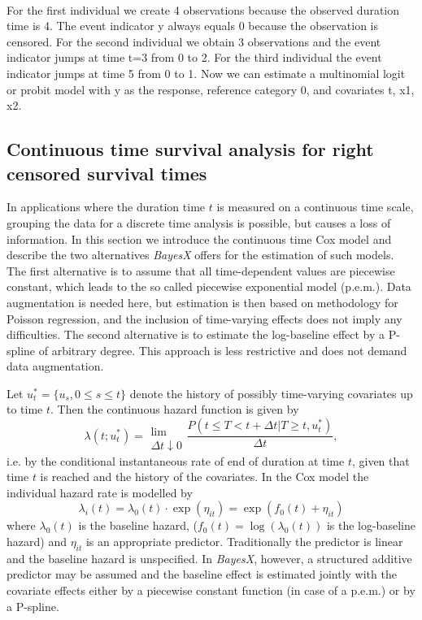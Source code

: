 \documentclass[11pt,a4paper,twoside]{bayesxarticle}
\begin{document}
\vspace{0.5cm}\\
For the first individual we create 4 observations because the
observed duration time is 4. The event indicator y always equals 0
because the observation is censored. For the second individual we
obtain 3 observations and the event indicator jumps at time t=3 from
0 to 2. For the third individual the event indicator jumps at time 5
from 0 to 1. Now we can estimate a multinomial logit or probit model
with y as the response, reference category 0, and covariates t, x1,
x2.


\subsection{Continuous time survival analysis for right censored survival times}
\label{continuoustime}

In applications where the duration time $t$ is measured on a
continuous time scale, grouping the data for a discrete time
analysis is possible, but causes a loss of information. In this
section we introduce the continuous time Cox model and describe the
two alternatives \textit{BayesX} offers for the estimation of such
models. The first alternative is to assume that all time-dependent
values are piecewise constant, which leads to the so called
piecewise exponential model (p.e.m.). Data augmentation is needed
here, but estimation is then based on methodology for Poisson
regression, and the inclusion of time-varying effects does not imply
any difficulties. The second alternative is to estimate the
log-baseline effect by a P-spline of arbitrary degree. This approach
is less restrictive and does not demand data augmentation.

Let $u_t^{*}=\{u_s,0 \le s \le t\}$ denote the history of possibly
time-varying covariates up to time $t$. Then the continuous hazard
function is given by
\[
\lambda(t;u_t^{*})=\begin{array}{c}\\\mbox{lim}\\{\Delta t
\downarrow 0}\end{array}\frac{P(t \le T< t+\Delta t | T\ge t,
u_t^{*})}{\Delta t},
\]
i.e. by the conditional instantaneous rate of end of duration at
time $t$, given that time $t$ is reached and the history of the
covariates. In the Cox model the individual hazard rate is modelled
by
\begin{equation}\label{CoxModel}
\lambda_i(t)=\lambda_0(t)\cdot
\exp(\eta_{it})=\exp(f_0(t)+\eta_{it})
\end{equation}
where $\lambda_0(t)$ is the baseline hazard,
($f_0(t)=\log(\lambda_0(t))$ is the log-baseline hazard) and
$\eta_{it}$ is an appropriate predictor. Traditionally the predictor
is linear and the baseline hazard is unspecified. In
\textit{BayesX}, however, a structured additive predictor may be
assumed and the baseline effect is estimated jointly with the
covariate effects either by a piecewise constant function (in case
of a p.e.m.) or by a P-spline.
\end{document}
